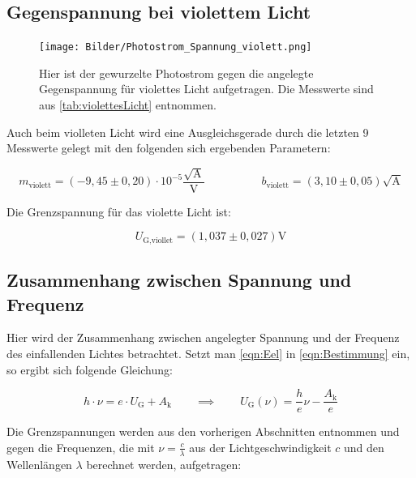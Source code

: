 \documentclass[titlepage = firstcover]{scrartcl}
\begin{document}
        \newpage
        \subsection{Gegenspannung bei violettem Licht}
            \begin{figure}[h]
              \centering
              \texttt{[image: Bilder/Photostrom\_Spannung\_violett.png]}
              \caption{Hier ist der gewurzelte Photostrom gegen die angelegte Gegenspannung für violettes Licht aufgetragen. Die Messwerte sind aus \autoref{tab:violettesLicht} entnommen.}
              \label{fig:gelbesLicht}
            \end{figure}

            \FloatBarrier
    
            Auch beim violleten Licht wird eine Ausgleichsgerade durch die letzten 9 Messwerte gelegt mit den folgenden sich ergebenden Parametern:

            \begin{equation*}
              m_{\text{violett}} = (-9,45 \pm 0,20) \cdot 10^{-5} \frac{\sqrt{\text{A}}}{\text{V}} \qquad \quad \qquad b_{\text{violett}} = (3,10 \pm 0,05) \sqrt{\text{A}}
            \end{equation*}

            Die Grenzspannung für das violette Licht ist:

            \begin{equation*}
              U_\text{G,viollet} = (1,037 \pm 0,027) \text{V}
            \end{equation*}

        \subsection{Zusammenhang zwischen Spannung und Frequenz}
            Hier wird der Zusammenhang zwischen angelegter Spannung und der Frequenz des einfallenden Lichtes betrachtet.
            Setzt man \autoref{eqn:Eel} in \autoref{eqn:Bestimmung} ein, so ergibt sich folgende Gleichung:
            
            \begin{equation}
              h \cdot \nu = e \cdot U_{\text{G}} + A_{\text{k}} \qquad \implies \qquad U_{\text{G}}(\nu) = \frac{h}{e} \nu - \frac{A_{\text{k}}}{e}
              \label{eqn:spannung_frequenz}
            \end{equation}

            Die Grenzspannungen werden aus den vorherigen Abschnitten entnommen und gegen die Frequenzen, die mit $\nu = \frac{c}{\lambda}$ aus der Lichtgeschwindigkeit $c$ und den Wellenlängen $\lambda$ berechnet werden, aufgetragen:
\end{document}
